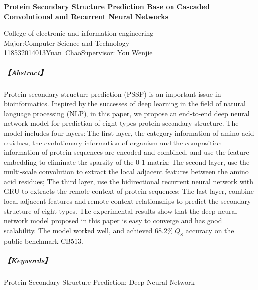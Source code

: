 \documentclass[a4paper, tikz]{article}
\newcommand{\hei}{\CJKfamily{hei}}
\newcommand{\kai}{\CJKfamily{kai}}
\newcommand{\xiaoerhao}{\fontsize{18pt}{\baselineskip}\selectfont}  %
\newcommand{\xiaosihao}{\fontsize{12pt}{\baselineskip}\selectfont}  %
\newcommand{\xiaowuhao}{\fontsize{9pt}{\baselineskip}\selectfont}   %
\begin{document}
\newpage
	



\newpage

\begin{center}
\begin{spacing}{1.5}
\bfseries\xiaoerhao\hei Protein Secondary Structure Prediction Base on Cascaded Convolutional and Recurrent Neural Networks
\end{spacing}

\begin{spacing}{1.0}
\xiaosihao\kai College of electronic and information engineering\\
Major:Computer Science and Technology\\
118532014013\qquad Yuan\ Chao\qquad Supervisor: You Wenjie
\end{spacing}
\end{center}

{\bfseries\xiaowuhao\kai 
\subparagraph{\hei【Abstract】}

Protein secondary structure prediction (PSSP) is an important issue in bioinformatics. Inspired by the successes of deep learning in the field of natural language processing (NLP), in this paper, we propose an end-to-end deep neural network model for prediction of eight types protein secondary structure. The model includes four layers: The first layer, the category information of amino acid residues, the evolutionary information of organism and the composition information of protein sequences are encoded and combined, and use the feature embedding to eliminate the sparsity of the 0-1 matrix; The second layer, use the multi-scale convolution to extract the local adjacent features between the amino acid residues; The third layer, use the bidirectional recurrent neural network with GRU to extracts the remote context of protein sequences; The last layer, combine local adjacent features and remote context relationships to predict the secondary structure of eight types. The experimental results show that the deep neural network model proposed in this paper is easy to converge and has good scalability. The model worked well, and achieved 68.2\% $Q_8$ accuracy on the public benchmark CB513.

\subparagraph{\hei【Keywords】}Protein Secondary Structure Prediction; Deep Neural Network
}
\end{document}
